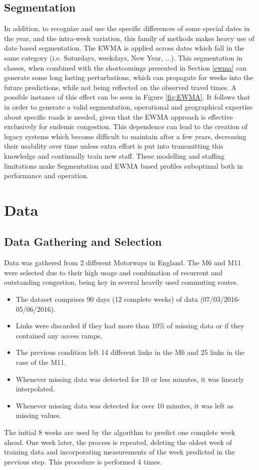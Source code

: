 \documentclass[letterpaper, 10 pt, conference]{ieeeconf}  %
\begin{document}
\subsection{Segmentation}\label{segmentation}
In addition, to recognize and use the specific differences of some special dates in the year, and the intra-week variation, this family of methods makes heavy use of date based segmentation. 
The EWMA is applied across dates which fall in the same category (i.e. Saturdays, weekdays, New Year, ...).
This segmentation in classes, when combined with the shortcomings presented in Section \ref{ewma} can generate some long lasting perturbations, which can propagate for weeks into the future predictions, while not being reflected on the observed travel times. A possible instance of this effect can be seen in Figure \ref{fig:EWMA}.
It follows that in order to generate a valid segmentation, operational and geographical expertise about specific roads is needed, given that the EWMA approach is effective exclusively for endemic congestion. 
This dependence can lead to the creation of legacy systems which become difficult to maintain after a few years, decreasing their usability over time unless extra effort is put into transmitting this knowledge and continually train new staff.
These modelling and staffing limitations make Segmentation and EWMA based profiles suboptimal both in performance and operation.
\section{Data}
\subsection{Data Gathering and Selection}
Data was gathered from 2 different Motorways in England.
The M6 and M11 were selected due to their high usage and combination of recurrent and outstanding congestion, being key in several heavily used commuting routes. 
\begin{itemize}
	\item The dataset comprises 90 days (12 complete weeks) of data (07/03/2016-05/06/2016).
	\item Links were discarded if they had more than 10\% of missing data or if they contained any access ramps.
	\item The previous condition left 14 different links in the M6 and 25 links in the case of the M11.
	\item Whenever missing data was detected for 10 or less minutes, it was linearly interpolated.
	\item Whenever missing data was detected for over 10 minutes, it was left as missing values.
\end{itemize}
The initial 8 weeks are used by the algorithm to predict one complete week ahead.
One week later, the process is repeated, deleting the oldest week of training data and incorporating measurements of the week predicted in the previous step. 
This procedure is performed 4 times.
\end{document}
